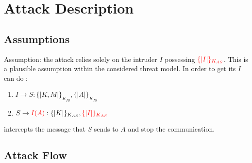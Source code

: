 \documentclass[11pt]{article}
\begin{document}
    \section{Attack Description}
    \subsection{Assumptions}
    \label{sec:assumptions}
    Assumption: the attack relies solely on the intruder $I$ possessing $\textcolor{red}{\{|I|\}_{K_{AS}}}$. This is a plausible
    assumption within the considered threat model. In order to get its $I$ can do :
    \begin{enumerate}
        \item $I \rightarrow S: \{| K, M |\}_{K_{IS}}, \{|A|\}_{K_{IS}}$
        \item $S \rightarrow \textcolor{red}{I(A)} : \{| K|\}_{K_{AS}}, \textcolor{red}{\{|I|\}_{K_{AS}}}$
    \end{enumerate}
    intercepts the message that $S$ sends to $A$ and stop the communication.

    \subsection{Attack Flow}
\end{document}
